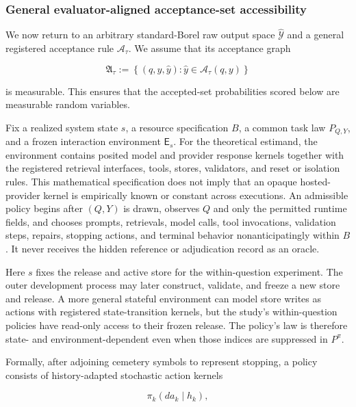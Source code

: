 \documentclass[10pt]{article} %
\providecommand{\1}{\mathbf{1}}  %
\theoremstyle{remark}
\theoremstyle{definition}
\begin{document}
\subsubsection{General evaluator-aligned acceptance-set accessibility}
\label{subsubsec:acceptance-set-accessibility}

We now return to an arbitrary standard-Borel raw output space $\widehat{\mathcal Y}$ and a general registered acceptance rule $\mathcal A_\tau$. We assume that its acceptance graph

\begin{equation}
\mathfrak A_\tau
:=
\left\{
(q,y,\widehat y):
\widehat y\in\mathcal A_\tau(q,y)
\right\}
\end{equation}

is measurable. This ensures that the accepted-set probabilities scored below are measurable random variables.

Fix a realized system state $s$, a resource specification $B$, a common task law $P_{Q,Y}$, and a frozen interaction environment $\mathsf E_s$. For the theoretical estimand, the environment contains posited model and provider response kernels together with the registered retrieval interfaces, tools, stores, validators, and reset or isolation rules. This mathematical specification does not imply that an opaque hosted-provider kernel is empirically known or constant across executions. An admissible policy begins after $(Q,Y)$ is drawn, observes $Q$ and only the permitted runtime fields, and chooses prompts, retrievals, model calls, tool invocations, validation steps, repairs, stopping actions, and terminal behavior nonanticipatingly within $B$. It never receives the hidden reference or adjudication record as an oracle.

Here $s$ fixes the release and active store for the within-question
experiment. The outer development process may later construct,
validate, and freeze a new store and release. A more general
stateful environment can model store writes as actions with registered
state-transition kernels, but the study's within-question policies
have read-only access to their frozen release. The policy's law is
therefore state- and environment-dependent even when those indices are
suppressed in $P^\pi$.

Formally, after adjoining cemetery symbols to represent stopping, a policy consists of history-adapted stochastic action kernels

\begin{equation}
\pi_k(da_k\mid h_k),
\end{equation}
\end{document}
